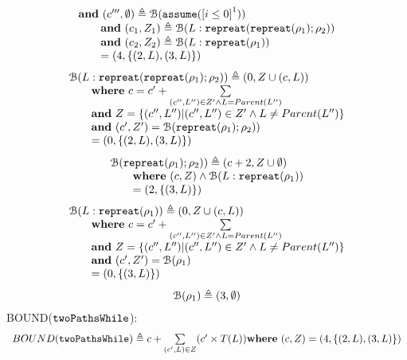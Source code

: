 \begin{enumerate}
\[\begin{array}{l}
  \textbf{and} ~(c''', \emptyset) \triangleq  \BD( \rpasum(\clabel{i \leq 0}^{1}))
  \\ \qquad
  \textbf{and} ~(c_1, Z_1) \triangleq 
   \BD(L:  \rprepeat(\rprepeat(\rho_1); \rho_2))
      \\ \qquad
  \textbf{and} ~(c_2, Z_2) \triangleq  \BD(L: \rprepeat(\rho_1))
      \\ \qquad = (4, \{(2, L), (3, L)\})
    \end{array}
\]
\[
\begin{array}{l}
  \mathcal{B}(L:  \mathtt{repreat}(\mathtt{repreat}(\rho_1); \rho_2)) \triangleq (0, Z \cup (c, L)) \\ \qquad
  \textbf{where} ~ c = c' + \sum\limits_{(c'', L'') \in Z' \land L = Parent(L'')}
  \\ \qquad
  \textbf{and} ~
  Z = \{(c'', L'') | (c'', L'') \in Z' \land L \neq Parent(L'')\}
  \\
  \qquad
  \textbf{and} ~ (c', Z') = \mathcal{B}(\mathtt{repreat}(\rho_1); \rho_2))
  \\ \qquad = (0, \{(2, L), (3, L)\})
\end{array}
\]
\[
\begin{array}{l}
  \mathcal{B}(\mathtt{repreat}(\rho_1); \rho_2))  \triangleq (c + 2, Z \cup \emptyset) 
  \\ \qquad
  \textbf{where} ~ (c, Z) \land \mathcal{B}(L : \mathtt{repreat}(\rho_1))
  \\ \qquad = (2, \{( 3, L)\})
\end{array}
\]
\[
\begin{array}{l}
  \mathcal{B}(L : \mathtt{repreat}(\rho_1))  \triangleq (0, Z \cup (c, L)) 
  \\ \qquad
  \textbf{where} ~ c = c' + \sum\limits_{(c'', L'') \in Z' \land L = Parent(L'')}
  \\ \qquad
  \textbf{and} ~
  Z = \{(c'', L'') | (c'', L'') \in Z' \land L \neq Parent(L'')\}
  \\
  \qquad
  \textbf{and} ~ (c', Z') = \mathcal{B}(\rho_1)
  \\ \qquad = (0, \{(3, L)\})
\end{array}
\]
\[
\begin{array}{l}
  \mathcal{B}(\rho_1)  \triangleq (3, \emptyset) 
\end{array}
\]
BOUND($\mathtt{twoPathsWhile}$):
\[
\begin{array}{l}
  BOUND(\mathtt{twoPathsWhile})
  \triangleq c + \sum\limits_{(c', L) \in Z}(c' \times T(L)) \textbf{where} ~ (c, Z) = (4, \{(2, L), (3, L)\})

\end{array}\]
\end{enumerate}
